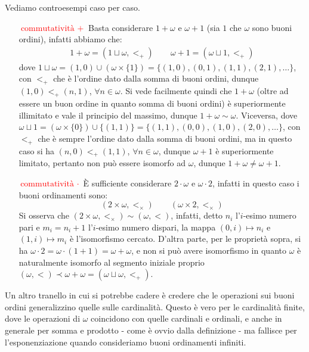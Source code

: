 \begin{soln}
	Vediamo controesempi caso per caso.
	\begin{itemize}
		\item[\textcolor{red}{$\boxed{\text{commutatività $+$}}$}] Basta considerare $1+\omega$ e $\omega + 1$ (sia $1$ che $\omega$ sono buoni ordini), infatti abbiamo che:
		\begin{align*}
			1+\omega = (1 \sqcup \omega, <_+) \qquad \omega + 1 = (\omega \sqcup 1, <_+) 
		\end{align*}
		dove $1 \sqcup \omega = (1,0)\cup (\omega \times \{1\}) = \{(1,0),(0,1),(1,1),(2,1),\ldots\}$, con $<_+$ che è l'ordine dato dalla somma di buoni ordini, dunque $(1,0)<_+(n,1)$, $\forall n \in \omega$. Si vede facilmente
		quindi che $1 + \omega$ (oltre ad essere un buon ordine in quanto somma di buoni ordini) è superiormente illimitato e vale il principio del massimo, dunque $1+\omega \sim \omega$. Viceversa, dove $\omega \sqcup 1 = (\omega \times \{0\})\cup \{(1,1)\} = \{(1,1),(0,0),(1,0),(2,0),\ldots\}$,
		con $<_+$ che è sempre l'ordine dato dalla somma di buoni ordini, ma in questo caso si ha $(n,0) <_+ (1,1)$, $\forall n \in \omega$, dunque $\omega + 1$ è superiormente limitato, pertanto non può essere isomorfo ad $\omega$, dunque $1 + \omega \ne \omega + 1$.
		\item[\textcolor{red}{$\boxed{\text{commutatività $\cdot$}}$}] È sufficiente considerare $2 \cdot \omega$ e $\omega \cdot 2$, infatti in questo caso i buoni ordinamenti sono:
		\[ (2 \times \omega,<_\times) \qquad (\omega \times 2, <_\times)
			\]
		Si osserva che $(2 \times \omega,<_\times) \sim (\omega,<)$, infatti, detto $n_i$ l'$i$-esimo numero pari e $m_i = n_i+1$ l'$i$-esimo numero dispari, la mappa $(0,i) \mapsto n_i$ e $(1,i) \mapsto m_i$ è l'isomorfismo cercato. D'altra parte, per le proprietà sopra, si ha $\omega \cdot 2 = \omega \cdot (1 + 1) = \omega + \omega$,
		e non si può avere isomorfismo in quanto $\omega$ è naturalmente isomorfo al segmento iniziale proprio $(\omega,<) \prec \omega + \omega = (\omega \sqcup \omega, <_+)$.
	\end{itemize}
\end{soln}

Un altro tranello in cui si potrebbe cadere è credere che le operazioni sui buoni ordini generalizzino quelle sulle cardinalità. Questo è vero per le cardinalità finite, dove le operazioni di $\omega$ coincidono con quelle cardinali e ordinali, e anche in generale 
per somma e prodotto - come è ovvio dalla definizione - ma fallisce per l'esponenziazione quando consideriamo buoni ordinamenti infiniti.

